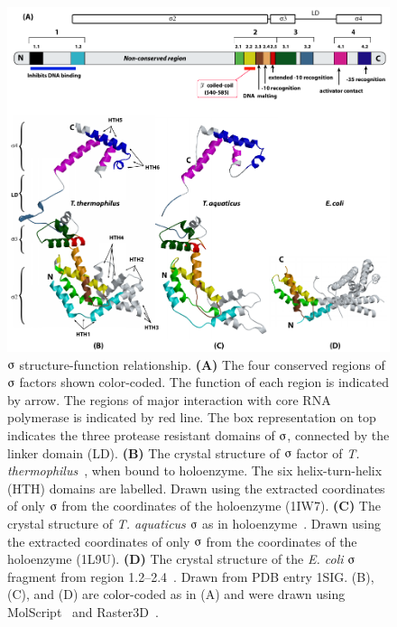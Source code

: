 \begin{figure}
\begin{narrow}{-1.5in}{-1.5in}
\centering
\includegraphics{figures/chap1_sigma_structure}
\end{narrow}
\caption[$\sigmaup$ structure-function relationship]{$\sigmaup$
structure-function relationship. \textbf{(A)} The four conserved
regions of $\sigmaup$ factors shown color-coded. The
function of each region is indicated by arrow. The regions of
major interaction with core RNA polymerase is indicated by red
line. The box representation on top indicates the three protease
resistant domains of $\sigmaup$, connected by the linker domain
(LD). \textbf{(B)} The crystal structure of $\sigmaup$ factor of
\emph{T. thermophilus}~\citep{Vassy2002}, when bound to
holoenzyme. The six helix-turn-helix (HTH) domains are labelled.
Drawn using the extracted coordinates of only $\sigmaup$ from the
coordinates of the holoenzyme (1IW7). \textbf{(C)} The crystal
structure of \emph{T. aquaticus} $\sigmaup$ as in
holoenzyme~\citep{Murakami2002b}. Drawn using the extracted
coordinates of only $\sigmaup$ from the coordinates of the
holoenzyme (1L9U). \textbf{(D)} The crystal structure of the
\emph{E. coli} $\sigmaup$ fragment from region
1.2--2.4~\citep{Malhotra1996}. Drawn from PDB entry 1SIG. (B),
(C), and (D) are color-coded as in (A) and were drawn using
MolScript~\citep{Esnouf1997} and Raster3D~\citep{Merrit1997}.}

\label{chap1:sigma}
\end{figure}

